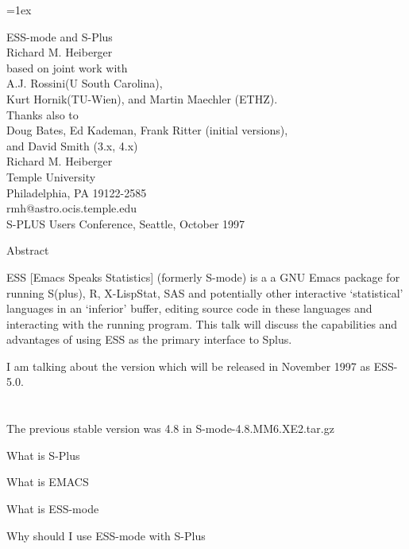 \documentclass[12pt]{article}   %
\begin{document}
\Huge
\parskip=1ex


\begin{center}
\Huge
ESS-mode and S-Plus\\
Richard M. Heiberger\\[1ex]
based on joint work with\\
A.J. Rossini(U South Carolina),\\
 Kurt Hornik(TU-Wien), and Martin Maechler (ETHZ).\\[2ex]
Thanks also to\\
Doug Bates, Ed Kademan, Frank Ritter (initial versions),\\
and David Smith (3.x, 4.x)\\[3ex]

Richard M. Heiberger\\[.4ex]
Temple University\\[.4ex]
Philadelphia, PA 19122-2585\\[.4ex]
{\sf rmh@astro.ocis.temple.edu}\\[2ex]
S-PLUS Users Conference, Seattle, October 1997
\end{center}


\newpage
\begin{center}Abstract\end{center}
ESS [Emacs Speaks Statistics] (formerly S-mode) is a a GNU Emacs
package for running S(plus), R, X-LispStat, SAS and potentially other
interactive `statistical' languages in an `inferior' buffer, editing
source code in these languages and interacting with the running
program.  This talk will discuss the capabilities and advantages of
using ESS as the primary interface to Splus.


I am talking about the version which will be released in November 1997
as ESS-5.0.\\
\hspace*{2ex}{\sf http://franz.stat.wisc.edu/pub/ESS/ESS-5.0.tar.gz}\\
\hspace*{2ex}{\sf ftp://franz.stat.wisc.edu/pub/ESS/ESS-5.0.tar.gz}\\
The previous stable version was 4.8 in
{\sf S-mode-4.8.MM6.XE2.tar.gz}\\

\newpage

What is S-Plus

What is EMACS

What is ESS-mode

Why should I use ESS-mode with S-Plus
\end{document}
